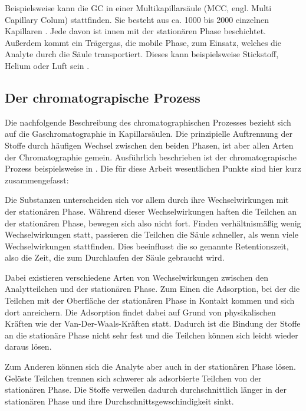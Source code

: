 Beispielsweise kann die GC in einer Multikapillarsäule (MCC, engl. Multi Capillary Colum) stattfinden. Sie besteht aus ca. 1000 bis 2000 einzelnen Kapillaren \cite{obinski1999, Baumbach2009}. Jede davon ist innen mit der stationären Phase beschichtet. Außerdem kommt ein Trägergas, die mobile Phase, zum Einsatz, welches die Analyte durch die Säule transportiert. Dieses kann beispielsweise Stickstoff, Helium \cite{obinski1999} oder Luft sein \cite{Baumbach2009}.

\subsection{Der chromatograpische Prozess}
Die nachfolgende Beschreibung des chromatographischen Prozesses bezieht sich auf die Gaschromatographie in Kapillarsäulen. Die prinzipielle Auftrennung der Stoffe durch häufigen Wechsel zwischen den beiden Phasen, ist aber allen Arten der Chromatographie gemein.
Ausführlich beschrieben ist der chromatograpische Prozess beispielsweise in \cite{kolb2003}.
Die für diese Arbeit wesentlichen Punkte sind hier kurz zusammengefasst:

Die Substanzen unterscheiden sich vor allem durch ihre Wechselwirkungen mit der stationären Phase. Während dieser Wechselwirkungen haften die Teilchen an der stationären Phase, bewegen sich also nicht fort. Finden verhältnismäßig wenig Wechselwirkungen statt, passieren die Teilchen die Säule schneller, als wenn viele Wechselwirkungen stattfinden. Dies beeinflusst die so genannte Retentionszeit, also die Zeit, die zum Durchlaufen der Säule gebraucht wird.

Dabei existieren verschiedene Arten von Wechselwirkungen zwischen den Analytteilchen und der stationären Phase. Zum Einen die Adsorption, bei der die Teilchen mit der Oberfläche der stationären Phase in Kontakt kommen und sich dort anreichern. Die Adsorption findet dabei auf Grund von physikalischen Kräften wie der Van-Der-Waals-Kräften statt. Dadurch ist die Bindung der Stoffe an die stationäre Phase nicht sehr fest und die Teilchen können sich leicht wieder daraus lösen.

Zum Anderen können sich die Analyte aber auch in der stationären Phase lösen. Gelöste Teilchen trennen sich schwerer als adsorbierte Teilchen von der stationären Phase. Die Stoffe verweilen dadurch durchschnittlich länger in der stationären Phase und ihre Durchschnittsgewschindigkeit sinkt.

